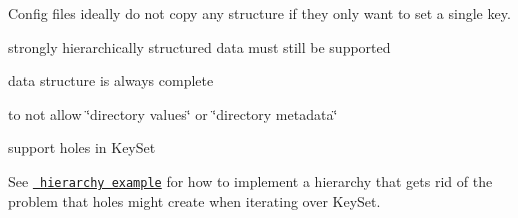 Config files ideally do not copy any structure if they only want to set a single key.


\begin{DoxyItemize}
\item strongly hierarchically structured data must still be supported
\end{DoxyItemize}


\begin{DoxyItemize}
\item data structure is always complete
\item to not allow \char`\"{}directory values\char`\"{} or \char`\"{}directory metadata\char`\"{}
\end{DoxyItemize}


\begin{DoxyItemize}
\item support holes in Key\+Set
\item See \href{/home/mpranj/workspace/libelektra/src/bindings/cpp/examples/cpp_example_hierarchy.cpp}{\texttt{ hierarchy example}} for how to implement a hierarchy that gets rid of the problem that holes might create when iterating over Key\+Set.
\end{DoxyItemize}